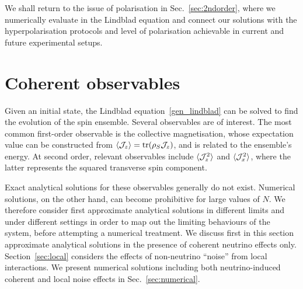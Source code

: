 \documentclass[aps,prd,10pt,twocolumn,superscriptaddress,floatfix,nofootinbib,amsmath,amssymb,altaffilletter,preprintnumbers]{revtex4-1}
\begin{document}
We shall return to the issue of polarisation in Sec.~\ref{sec:2ndorder}, where we numerically evaluate in the Lindblad equation and connect our solutions with the hyperpolarisation protocols and level of polarisation achievable in current and future experimental setups.


\section{Coherent observables}
\label{sec:coherentobservables}

Given an initial state, the Lindblad equation~\eqref{gen_lindblad} can be solved to find the evolution of the spin ensemble.  Several observables are of interest.  The most common first-order observable is the collective magnetisation, whose expectation value can be constructed from $\langle {\cal J}_z\rangle={\rm tr}(\rho_S {\cal J}_z)$, and is related to the ensemble's energy.  At second order, relevant observables include $\langle {\cal J}^2_z\rangle$ and $\langle {\cal J}^2_x\rangle$, where the latter represents the squared transverse spin component. 

Exact analytical solutions for these observables generally do not exist.  Numerical solutions, on the other hand, can become prohibitive for large values of $N$.  We therefore consider first approximate analytical solutions in different limits and under different settings in order to map out the limiting behaviours of the system, before attempting a numerical treatment.  We discuss first in this section approximate analytical solutions in the presence of coherent neutrino effects only.  Section~\ref{sec:local} considers the effects of non-neutrino ``noise'' from local interactions.   
We present numerical solutions including both neutrino-induced coherent and local noise effects in Sec.~\ref{sec:numerical}.
\end{document}
